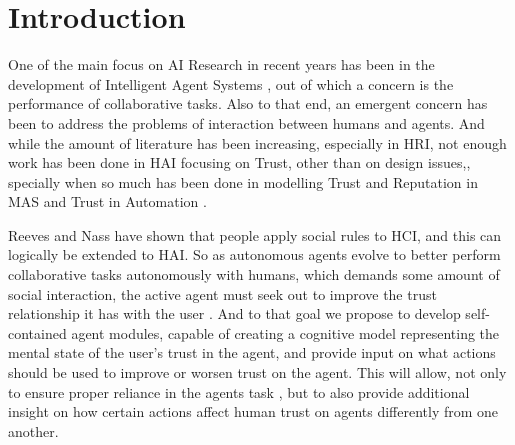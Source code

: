 \section{Introduction}
\label{sec:Introduction}

One of the main focus on \ac{AI} Research in recent years has been in the development of Intelligent Agent Systems \cite{Russell2009a}, out of which a concern is the performance of collaborative tasks\cite{Grosz1996, Allen2002, Allen2007}. Also to that end, an emergent concern has been to address the problems of interaction between humans and agents\cite{Bradshaw2011}. And while the amount of literature has been increasing, especially in \ac{HRI}\cite{Goodrich2007}, not enough work has been done in \ac{HAI} focusing on Trust, other than on design issues,\cite{Bickmore2005}, specially when so much has been done in modelling Trust and Reputation in \ac{MAS}\cite{Granatyr2015} and Trust in Automation \cite{Lee1992, Jones1997, Lee2004}.

Reeves and Nass have shown that people apply social rules to \ac{HCI}, and this can logically be extended to \ac{HAI}\cite{Reeves1998a}. So as autonomous agents evolve to better perform collaborative tasks autonomously with humans, which demands some amount of social interaction, the active agent must seek out to improve the trust relationship it has with the user \cite{Lashkari1994}. And to that goal we propose to develop self-contained agent modules, capable of creating a cognitive model representing the mental state of the user's trust in the agent, and provide input on what actions should be used to improve or worsen trust on the agent. This will allow, not only to ensure proper reliance in the agents task \cite{Lee2004}, but to also provide additional insight on how certain actions affect human trust on agents differently from one another.


